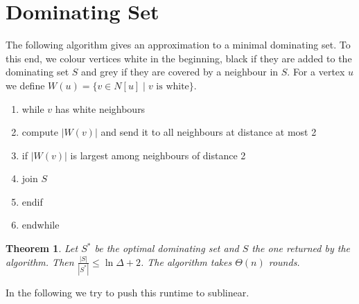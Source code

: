 \documentclass[a4paper, 12pt]{article}
\theoremstyle{plain}
\newtheorem{theorem}{Theorem}[section] %
\theoremstyle{definition}
\theoremstyle{lemma}
\theoremstyle{remark}
\theoremstyle{corollary}
\theoremstyle{example}
\begin{document}
\section{Dominating Set}
	The following algorithm gives an approximation to a minimal dominating set. To this end, we colour vertices white in the beginning, black if they are added to the dominating set $S$ and grey if they are covered by a neighbour in $S$. For a vertex $u$ we define $W(u) = \{v \in N[u]\mid v \text{ is white}\}$.
	\begin{enumerate}
		\item while $v$ has white neighbours
		\item compute $\left|W(v)\right|$ and send it to all neighbours at distance at most 2
		\item if $\left|W(v)\right|$ is largest among neighbours of distance 2
		\item join $S$
		\item endif
		\item endwhile
	\end{enumerate}
	\begin{theorem}
		Let $S^*$ be the optimal dominating set and $S$ the one returned by the algorithm. Then $\frac{\left|S\right|}{\left|S^*\right|} \leq \ln \Delta + 2$. The algorithm takes $\Theta(n)$ rounds.
	\end{theorem}
	In the following we try to push this runtime to sublinear.
\end{document}
